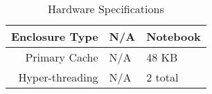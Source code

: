 \begin{table}[tbp]
\begin{center}
\begin{tabular}{| r | p{5cm} | p{5cm} |}
      Enclosure Type        & N/A                                                        & Notebook                                            \\ \hline
      Primary Cache         & N/A                                                        & 48 KB                                               \\ \hline
      Hyper-threading       & N/A                                                        & 2 total                                             \\
      \hline
    \end{tabular}
    \caption{Hardware Specifications}
    \label{table:hardwareSpecs}
    \end{center}
  \end{table}
